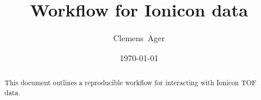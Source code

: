 \documentclass[twocolumn]{article}
\title{Workflow for Ionicon data}
\author{Clemens~Ager}
\date{\today}
\begin{document}
\maketitle

\begin{abstract}
  This document outlines a reproducible workflow for interacting with
  Ionicon TOF data.
\end{abstract}


\setcounter{tocdepth}{2}
\tableofcontents





\end{document}
